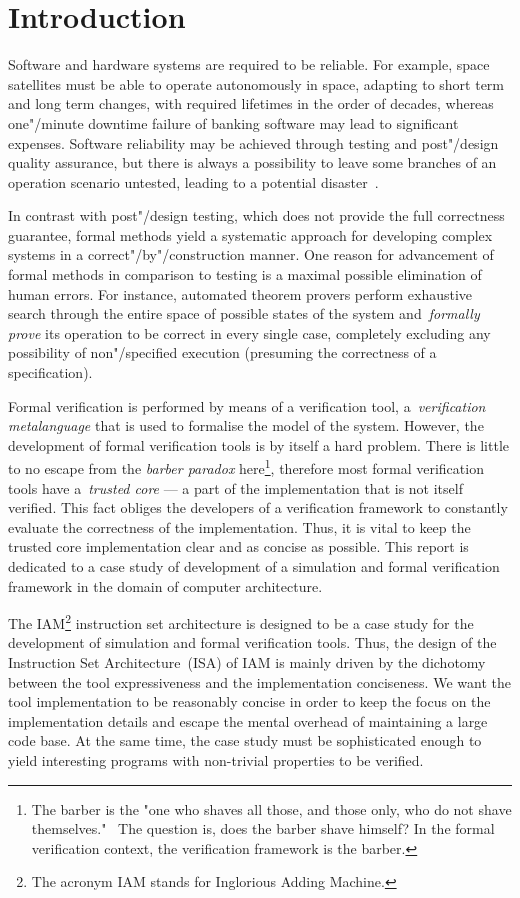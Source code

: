 \section{Introduction}

Software and hardware systems are required to be reliable.
For example, space satellites must be able to operate autonomously in space,
adapting to short term and long term changes,
with required lifetimes in the order of decades, whereas
one"/minute downtime failure of banking software may lead to significant expenses.
Software reliability may be achieved through testing and post"/design quality
assurance, but there is always a possibility to leave some branches of an operation
scenario untested, leading to a potential disaster~\cite{Leveson2004}.

In contrast with post"/design testing, which does not provide the full
correctness guarantee, formal methods yield a systematic approach for developing
complex systems in a correct"/by"/construction manner. One reason for advancement
of formal methods in comparison to testing is a maximal possible elimination of
human errors. For instance, automated theorem provers perform exhaustive search
through the entire space of possible states of the system and~\emph{formally prove} its
operation to be correct in every single case, completely excluding any possibility of
non"/specified execution (presuming the correctness of a specification).

Formal verification is performed by means of a verification tool,
a~\emph{verification metalanguage} that is used to formalise the model of the system.
However, the development of formal verification tools is by itself a hard problem.
There is little to no escape from the \emph{barber paradox} here\footnote{
The barber is the "one who shaves all those, and those only, who do not shave themselves."~
The question is, does the barber shave himself? In the formal verification context, the
verification framework is the barber.}, therefore most formal
verification tools have a~\emph{trusted core} --- a part of the implementation that
is not itself verified. This fact obliges the developers of a verification framework
to constantly evaluate the correctness of the implementation. Thus, it is vital
to keep the trusted core implementation clear and as concise as possible. This report
is dedicated to a case study of development of a simulation and formal verification
framework in the domain of computer architecture.

The IAM\footnote{The acronym IAM stands for Inglorious Adding Machine.} instruction
set architecture is designed to be a case study for the development of simulation
and formal verification tools. Thus, the design of the Instruction Set
Architecture~(ISA) of IAM is mainly driven by the dichotomy between the tool
expressiveness and the implementation conciseness.
We want the tool implementation to be reasonably concise in order to keep the
focus on the implementation details and escape the mental overhead of maintaining
a large code base. At the same time, the case study must be sophisticated enough
to yield interesting programs with non-trivial properties to be verified.

